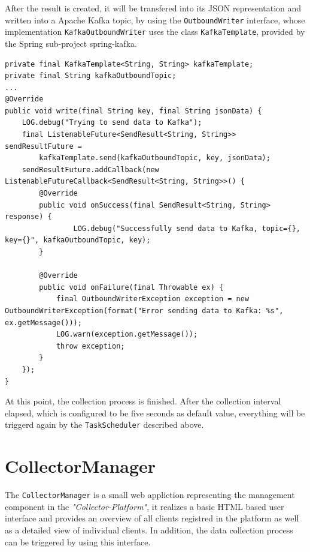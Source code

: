 After the result is created, it will be transfered into its JSON representation and written into a Apache Kafka topic, by using
the \verb|OutboundWriter| interface, whose implementation \verb|KafkaOutboundWriter| uses the class \verb|KafkaTemplate|, provided by the Spring sub-project spring-kafka.

\begin{lstlisting}[caption={"KafkaOutboundWriter", Send data}, captionpos=b, label={lst:outbound-writer}]
private final KafkaTemplate<String, String> kafkaTemplate;
private final String kafkaOutboundTopic;
...
@Override
public void write(final String key, final String jsonData) {
    LOG.debug("Trying to send data to Kafka");
    final ListenableFuture<SendResult<String, String>> sendResultFuture =
        kafkaTemplate.send(kafkaOutboundTopic, key, jsonData);
    sendResultFuture.addCallback(new ListenableFutureCallback<SendResult<String, String>>() {
        @Override
        public void onSuccess(final SendResult<String, String> response) {
                LOG.debug("Successfully send data to Kafka, topic={}, key={}", kafkaOutboundTopic, key);
        }

        @Override
        public void onFailure(final Throwable ex) {
            final OutboundWriterException exception = new OutboundWriterException(format("Error sending data to Kafka: %s", ex.getMessage()));
            LOG.warn(exception.getMessage());
            throw exception;
        }
    });
}
\end{lstlisting}
At this point, the collection process is finished. After the collection interval elapsed, which is configured to be five seconds as
default value, everything will be triggerd again by the \verb|TaskScheduler| described above.

\section{CollectorManager}

The \verb|CollectorManager| is a small web appliction representing the management component in the \textit{"Collector-Platform"}, it
realizes a basic HTML based user interface and provides an overview of all clients registred in the platform as well as a
detailed view of individual clients. In addition, the data collection process can be triggered by using this interface.

